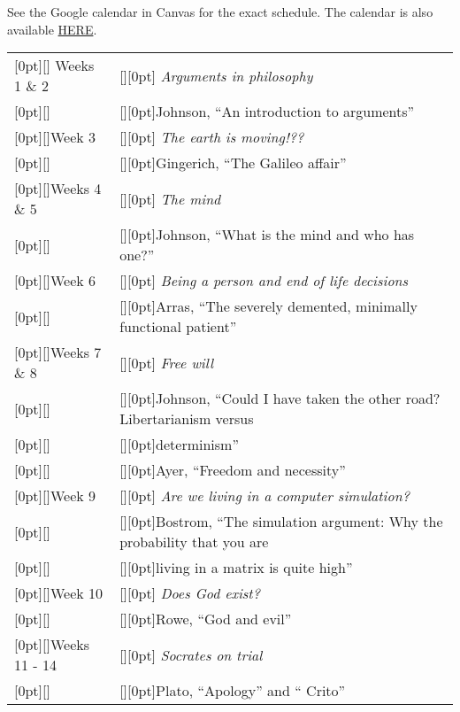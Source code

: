 \documentclass[11pt,oneside]{article}
\begin{document}
\begin{minipage}{\textwidth}
See the Google calendar in Canvas for the exact schedule. The calendar is also available \href{https://calendar.google.com/calendar/u/0?cid=YmoxZGY0djIxMmhiMjE1b3ZlMW1lbXFwdGtAZ3JvdXAuY2FsZW5kYXIuZ29vZ2xlLmNvbQ}{\url{HERE}}.

\vspace{3mm}

\begin{tabular}{@{}>{\columncolor{white}[0pt][\tabcolsep]}  l >{\columncolor{white}[\tabcolsep][0pt]} l @{}}
\hline
\rowcolor{gray1}
Weeks 1 \& 2 & \textit{Arguments in philosophy}\\
&\quad Johnson, ``An introduction to arguments''\\

\rowcolor{gray1}Week 3 & \textit{The earth is moving!??}\\
&\quad Gingerich, ``The Galileo affair''\\ 

\rowcolor{gray1}Weeks 4 \& 5 & \textit{The mind}\\
&\quad Johnson, ``What is the mind and who has one?''\\

\rowcolor{gray1}Week 6 & \textit{Being a person and end of life decisions}\\
&\quad Arras, ``The severely demented, minimally functional patient''\\

\rowcolor{gray1}Weeks 7 \& 8 & \textit{Free will}\\
&\quad Johnson, ``Could I have taken the other road? Libertarianism versus\\ 
&\quad\quad determinism''\\ 
&\quad Ayer, ``Freedom and necessity''\\ 

\rowcolor{gray1}Week 9 & \textit{Are we living in a computer simulation?}\\
&\quad Bostrom, ``The simulation argument: Why the probability that you are\\ 
&\quad\quad living in a matrix is quite high''\\

\rowcolor{gray1}Week 10 & \textit{Does God exist?}\\
&\quad Rowe, ``God and evil''\\

\rowcolor{gray1}Weeks 11 - 14 & \textit{Socrates on trial}\\
&\quad Plato, ``Apology'' and `` Crito''\\

\hline
\end{tabular}
\vspace{3mm}
\end{minipage}







\end{document}

